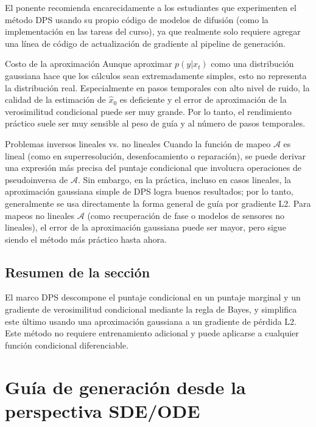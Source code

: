 \documentclass[a4paper]{article}
\begin{document}
El ponente recomienda encarecidamente a los estudiantes que experimenten el método DPS usando su propio código de modelos de difusión (como la implementación en las tareas del curso), ya que realmente solo requiere agregar una línea de código de actualización de gradiente al pipeline de generación.

\begin{warningbox}{Costo de la aproximación}
Aunque aproximar $p(y|x_t)$ como una distribución gaussiana hace que los cálculos sean extremadamente simples, esto no representa la distribución real. Especialmente en pasos temporales con alto nivel de ruido, la calidad de la estimación de $\hat{x}_0$ es deficiente y el error de aproximación de la verosimilitud condicional puede ser muy grande. Por lo tanto, el rendimiento práctico suele ser muy sensible al peso de guía y al número de pasos temporales.
\end{warningbox}

\begin{knowledgebox}{Problemas inversos lineales vs. no lineales}
Cuando la función de mapeo $\mathcal{A}$ es lineal (como en superresolución, desenfocamiento o reparación), se puede derivar una expresión más precisa del puntaje condicional que involucra operaciones de pseudoinversa de $\mathcal{A}$. Sin embargo, en la práctica, incluso en casos lineales, la aproximación gaussiana simple de DPS logra buenos resultados; por lo tanto, generalmente se usa directamente la forma general de guía por gradiente L2. Para mapeos no lineales $\mathcal{A}$ (como recuperación de fase o modelos de sensores no lineales), el error de la aproximación gaussiana puede ser mayor, pero sigue siendo el método más práctico hasta ahora.
\end{knowledgebox}

\subsection{Resumen de la sección}

El marco DPS descompone el puntaje condicional en un puntaje marginal y un gradiente de verosimilitud condicional mediante la regla de Bayes, y simplifica este último usando una aproximación gaussiana a un gradiente de pérdida L2. Este método no requiere entrenamiento adicional y puede aplicarse a cualquier función condicional diferenciable.
\section{Guía de generación desde la perspectiva SDE/ODE}
\end{document}
